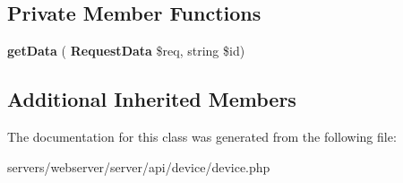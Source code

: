 \subsection*{Private Member Functions}
\begin{DoxyCompactItemize}
\item 
\mbox{\label{class_lora_1_1_api_1_1_action___device_aaed57abc90b47df34b294e5e49ef63ae}} 
{\bfseries get\+Data} (\textbf{ Request\+Data} \$req, string \$id)
\end{DoxyCompactItemize}
\subsection*{Additional Inherited Members}


The documentation for this class was generated from the following file\+:\begin{DoxyCompactItemize}
\item 
servers/webserver/server/api/device/device.\+php\end{DoxyCompactItemize}
